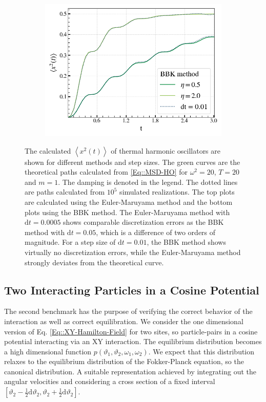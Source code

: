 \begin{figure}[tb]
\begin{subfigure}{0.5\textwidth}
		\end{subfigure}
		\begin{subfigure}{0.5\textwidth}
			\centering
			\includegraphics[width=0.95\linewidth]{graphics/HO-BBK-0.01.png}
		\end{subfigure}
		\caption{The calculated $\left \langle x^2 (t) \right \rangle $ of thermal harmonic oscillators are shown for different methods and step sizes. The green curves are the theoretical paths calculated from \eqref{Eq::MSD-HO} for $\omega^2 =	20$, $T	=	20$ and $m=1$.	The damping is denoted in the legend. The dotted lines are paths calculated from $10^5$ simulated realizations. The top plots are calculated using the Euler-Maruyama method and the bottom plots using the BBK	method. The Euler-Maruyama method with $\text{d}t =	0.0005$ shows comparable discretization errors as the BBK method with $\text{d}t =	0.05$, which is a difference of two orders of magnitude. For a step size of $\text{d}t = 0.01$, the BBK method shows virtually no discretization errors, while the Euler-Maruyama method strongly deviates from the theoretical curve.}
		\label{Fig::MSD-Comparison}
	\end{figure}
	\subsection{Two Interacting Particles in a Cosine Potential}
	The second benchmark has the purpose of verifying the correct behavior of the interaction as well as correct equilibration. We consider the one dimensional version of Eq. \eqref{Eq::XY-Hamilton-Field} for two sites, so particle-pairs in a cosine potential interacting via an XY interaction. The equilibrium distribution becomes a high dimensional function $p(\vartheta_1, \vartheta_2, \omega_1, \omega_2)$. We expect that this distribution relaxes to the equilibrium distribution of the Fokker-Planck equation, so the canonical distribution. A suitable representation achieved by integrating out the angular velocities and considering a cross section of a fixed interval $\left[\vartheta_2 - \tfrac{1}{2} \text{d} \vartheta_2, \vartheta_2 + \tfrac{1}{2} \text{d} \vartheta_2 \right]$.  \\
	
